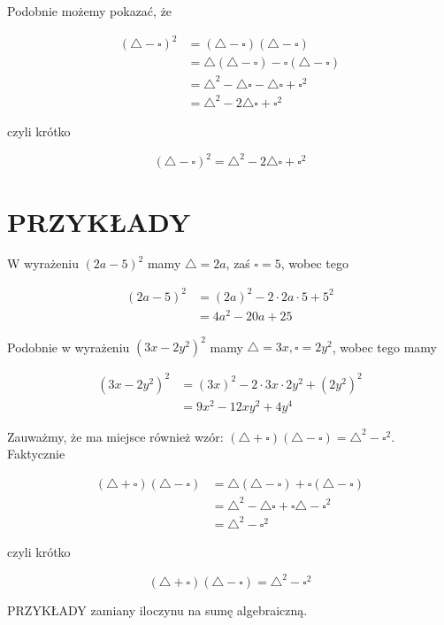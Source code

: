 \documentclass[10pt]{article}
\begin{document}
Podobnie możemy pokazać, że

\[
\begin{aligned}
(\triangle-\square)^{2} & =(\triangle-\square)(\triangle-\square) \\
& =\triangle(\triangle-\square)-\square(\triangle-\square) \\
& =\triangle^{2}-\triangle \square-\triangle \square+\square^{2} \\
& =\triangle^{2}-2 \triangle \square+\square^{2}
\end{aligned}
\]

czyli krótko

\[
(\triangle-\square)^{2}=\triangle^{2}-2 \triangle \square+\square^{2}
\]

\section*{PRZYKŁADY}
W wyrażeniu \((2 a-5)^{2}\) mamy \(\triangle=2 a\), zaś \(\square=5\), wobec tego

\[
\begin{aligned}
(2 a-5)^{2} & =(2 a)^{2}-2 \cdot 2 a \cdot 5+5^{2} \\
& =4 a^{2}-20 a+25
\end{aligned}
\]

Podobnie w wyrażeniu \(\left(3 x-2 y^{2}\right)^{2}\) mamy \(\triangle=3 x, \square=2 y^{2}\), wobec tego mamy

\[
\begin{aligned}
\left(3 x-2 y^{2}\right)^{2} & =(3 x)^{2}-2 \cdot 3 x \cdot 2 y^{2}+\left(2 y^{2}\right)^{2} \\
& =9 x^{2}-12 x y^{2}+4 y^{4}
\end{aligned}
\]

Zauważmy, że ma miejsce również wzór: \((\triangle+\square)(\triangle-\square)=\triangle^{2}-\square^{2}\). Faktycznie

\[
\begin{aligned}
(\triangle+\square)(\triangle-\square) & =\triangle(\triangle-\square)+\square(\triangle-\square) \\
& =\triangle^{2}-\triangle \square+\square \triangle-\square^{2} \\
& =\triangle^{2}-\square^{2}
\end{aligned}
\]

czyli krótko

\[
(\triangle+\square)(\triangle-\square)=\triangle^{2}-\square^{2}
\]

PRZYKŁADY zamiany iloczynu na sumę algebraiczną.
\end{document}
